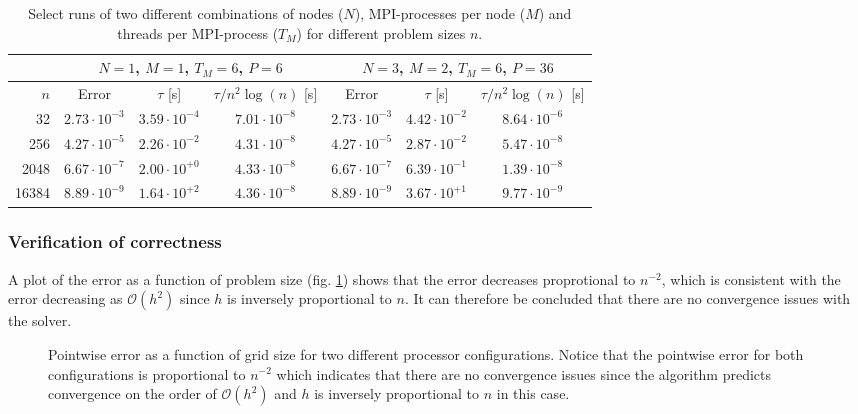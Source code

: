 \documentclass[11pt,a4paper,english]{article}
\numberwithin{figure}{subsection}
\numberwithin{table}{subsection}
\begin{document}
\begin{table}[hb]
	\centering
	\caption{Select runs of two different combinations of nodes ($N$), MPI-processes per node ($M$) and threads per MPI-process ($T_M$) for different problem sizes $n$. }
	\label{tab:errorresults}
	\begin{tabular}{r||c|c|c||c|c|c}
\multicolumn{1}{c}{}& \multicolumn{3}{c||}{$N=1$, $M=1$, $T_M=6$, $P=6$}&\multicolumn{3}{c}{$N=3$, $M=2$, $T_M=6$, $P=36$} \\
\hline
$n$ & Error & $\tau$ [s]& ${\tau}/{n^2\log(n)}$ [s]& Error & $\tau$ [s]& ${\tau}/{n^2\log(n)}$ [s]\\ 
\hline
32		& $2.73\cdot10^{-3}$ & $3.59\cdot10^{-4}$ & $7.01\cdot10^{-8}$ & $2.73\cdot10^{-3}$ 	& $4.42\cdot10^{-2}$	&  $8.64\cdot10^{-6}$\\ 

256		& $4.27\cdot10^{-5}$ & $2.26\cdot10^{-2}$ & $4.31\cdot10^{-8} $ & $4.27\cdot10^{-5}$ 	& $2.87\cdot10^{-2}$	&  $5.47\cdot10^{-8}$\\ 

2048	& $6.67\cdot10^{-7}$ & $2.00\cdot10^{+0} $ & $4.33\cdot10^{-8} $ & $6.67\cdot10^{-7}$	& $6.39\cdot10^{-1} $	&  $1.39\cdot10^{-8}$\\ 

16384	& $8.89\cdot10^{-9}$ & $1.64\cdot10^{+2} $ & $4.36\cdot10^{-8} $ & $8.89\cdot10^{-9}$	& $3.67\cdot10^{+1}$	&  $9.77\cdot10^{-9}$\\ 
	\end{tabular} 
\end{table}

\subsubsection{Verification of correctness}
A plot of the error as a function of problem size (fig. \ref{fig:error}) shows that the error decreases proprotional to $n^{-2}$, which is consistent with the error decreasing as $\mathcal{O}(h^2)$ since $h$ is inversely proportional to $n$. It can therefore be concluded that there are no convergence issues with the solver.

\begin{figure}[tbp]
	\centering
	
	\caption{Pointwise error as a function of grid size for two different processor configurations. Notice that the pointwise error for both configurations is proportional to $n^{-2}$ which indicates that there are no convergence issues since the algorithm predicts convergence on the order of $\mathcal{O}(h^2)$ and $h$ is inversely proportional to $n$ in this case.}
	\label{fig:error}
\end{figure}
\end{document}
